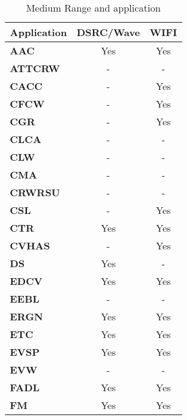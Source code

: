 \FloatBarrier
\begin{table}[ht!]
\centering
\caption{Medium Range and application }
    \label{fig:techandappmedium}
\begin{tabular}{lcc}
\hline
\textbf{Application} & \textbf{DSRC/Wave} & \textbf{WIFI} \\
\hline
\textbf{AAC}                  & Yes                & Yes           \\
\textbf{ATTCRW}               & -                  & -             \\
\textbf{CACC}                 & -                  & Yes           \\
\textbf{CFCW}                 & -                  & Yes           \\
\textbf{CGR}                  & -                  & Yes           \\
\textbf{CLCA}                 & -                  & -             \\
\textbf{CLW}                  & -                  & -             \\
\textbf{CMA}                  & -                  & -             \\
\textbf{CRWRSU}               & -                  & -             \\
\textbf{CSL}                  & -                  & Yes           \\
\textbf{CTR}                  & Yes                & Yes           \\
\textbf{CVHAS}                & -                  & Yes           \\
\textbf{DS}                   & Yes                & -             \\
\textbf{EDCV}                 & Yes                & Yes           \\
\textbf{EEBL}                 & -                  & -             \\
\textbf{ERGN}                 & Yes                & Yes           \\
\textbf{ETC}                  & Yes                & Yes           \\
\textbf{EVSP}                 & Yes                & Yes           \\
\textbf{EVW}                  & -                  & -             \\
\textbf{FADL}                 & Yes                & Yes           \\
\textbf{FM}                   & Yes                & Yes           \\

\end{tabular}
\end{table}
